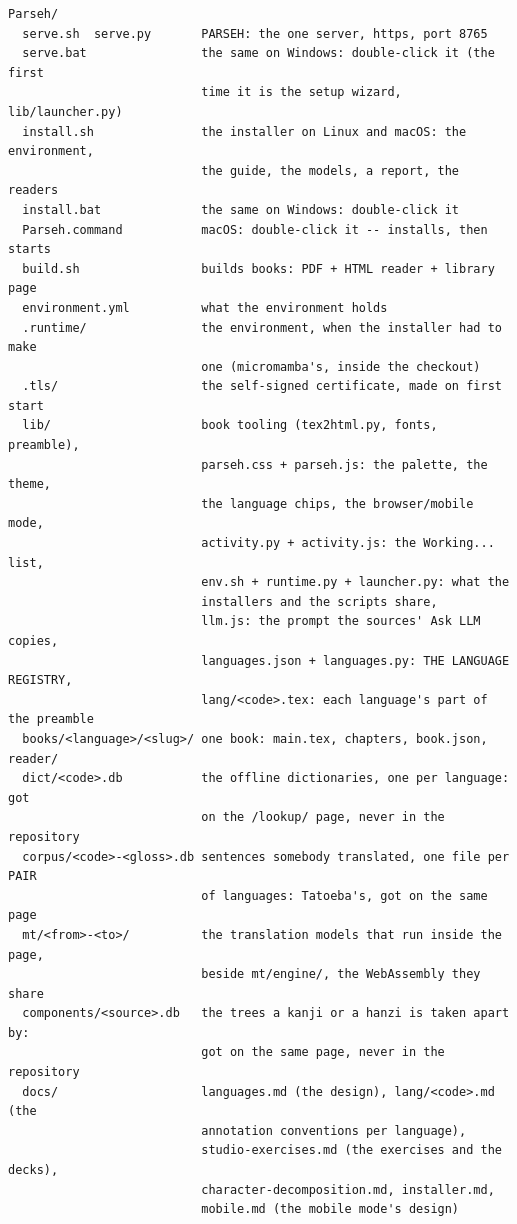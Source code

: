 \documentclass[11pt,oneside]{report}
\begin{document}
\begin{lstlisting}
Parseh/
  serve.sh  serve.py       PARSEH: the one server, https, port 8765
  serve.bat                the same on Windows: double-click it (the first
                           time it is the setup wizard, lib/launcher.py)
  install.sh               the installer on Linux and macOS: the environment,
                           the guide, the models, a report, the readers
  install.bat              the same on Windows: double-click it
  Parseh.command           macOS: double-click it -- installs, then starts
  build.sh                 builds books: PDF + HTML reader + library page
  environment.yml          what the environment holds
  .runtime/                the environment, when the installer had to make
                           one (micromamba's, inside the checkout)
  .tls/                    the self-signed certificate, made on first start
  lib/                     book tooling (tex2html.py, fonts, preamble),
                           parseh.css + parseh.js: the palette, the theme,
                           the language chips, the browser/mobile mode,
                           activity.py + activity.js: the Working... list,
                           env.sh + runtime.py + launcher.py: what the
                           installers and the scripts share,
                           llm.js: the prompt the sources' Ask LLM copies,
                           languages.json + languages.py: THE LANGUAGE REGISTRY,
                           lang/<code>.tex: each language's part of the preamble
  books/<language>/<slug>/ one book: main.tex, chapters, book.json, reader/
  dict/<code>.db           the offline dictionaries, one per language: got
                           on the /lookup/ page, never in the repository
  corpus/<code>-<gloss>.db sentences somebody translated, one file per PAIR
                           of languages: Tatoeba's, got on the same page
  mt/<from>-<to>/          the translation models that run inside the page,
                           beside mt/engine/, the WebAssembly they share
  components/<source>.db   the trees a kanji or a hanzi is taken apart by:
                           got on the same page, never in the repository
  docs/                    languages.md (the design), lang/<code>.md (the
                           annotation conventions per language),
                           studio-exercises.md (the exercises and the decks),
                           character-decomposition.md, installer.md,
                           mobile.md (the mobile mode's design)

\end{lstlisting}
\end{document}
